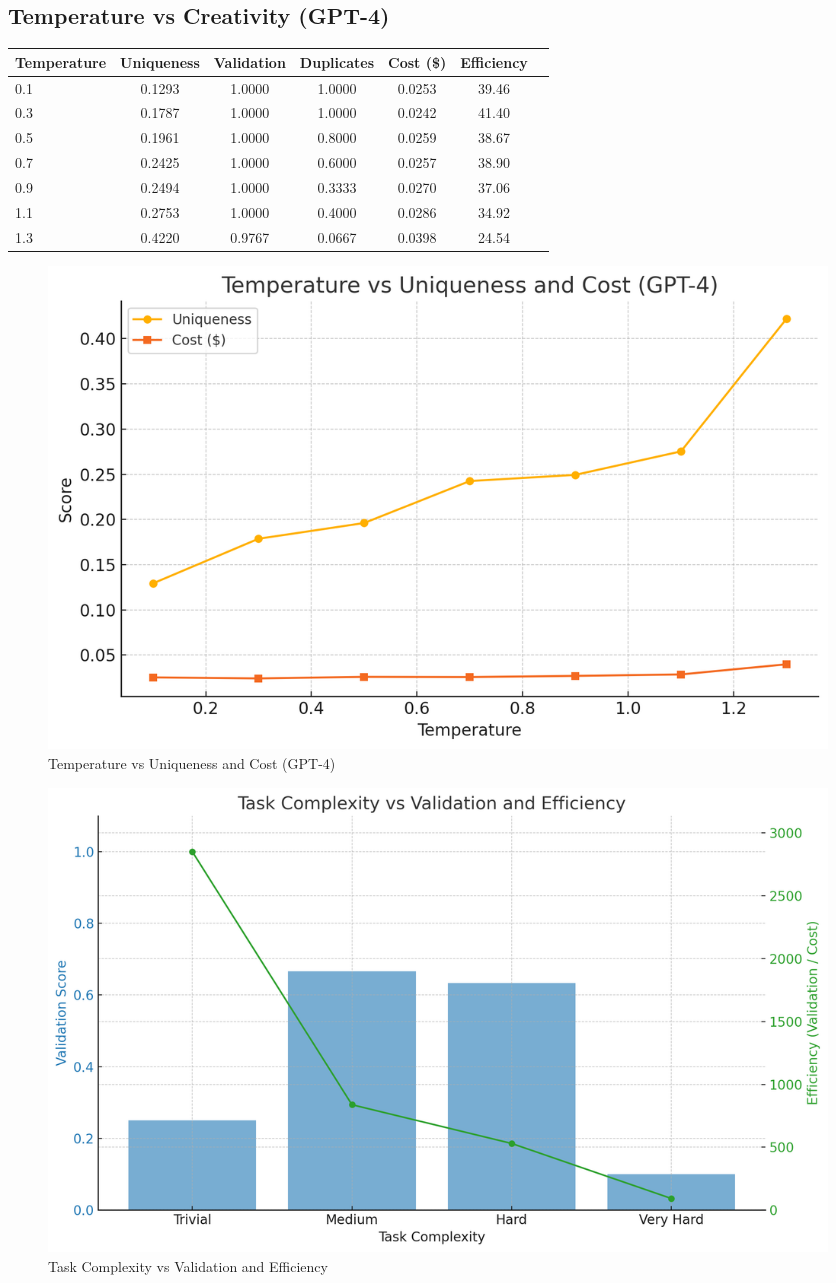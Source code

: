 \documentclass{article}
\begin{document}
\subsection*{Temperature vs Creativity (GPT-4)}
\begin{center}
\begin{tabular}{lcccccc}
\toprule
Temperature & Uniqueness & Validation & Duplicates & Cost (\$) & Efficiency \\
\midrule
0.1 & 0.1293 & 1.0000 & 1.0000 & 0.0253 & 39.46 \\
0.3 & 0.1787 & 1.0000 & 1.0000 & 0.0242 & 41.40 \\
0.5 & 0.1961 & 1.0000 & 0.8000 & 0.0259 & 38.67 \\
0.7 & 0.2425 & 1.0000 & 0.6000 & 0.0257 & 38.90 \\
0.9 & 0.2494 & 1.0000 & 0.3333 & 0.0270 & 37.06 \\
1.1 & 0.2753 & 1.0000 & 0.4000 & 0.0286 & 34.92 \\
1.3 & 0.4220 & 0.9767 & 0.0667 & 0.0398 & 24.54 \\
\bottomrule
\end{tabular}
\end{center}

\begin{figure}[h!]
  \centering
  \includegraphics[width=0.75\linewidth]{temperature_plot.png}
  \caption{Temperature vs Uniqueness and Cost (GPT-4)}
  \label{fig:temperature_plot}
\end{figure}

\begin{figure}[h!]
    \centering
    \includegraphics[width=0.75\linewidth]{complexity_plot.png}
    \caption{Task Complexity vs Validation and Efficiency}
    \label{fig:complexity_plot}
  \end{figure}
\end{document}

